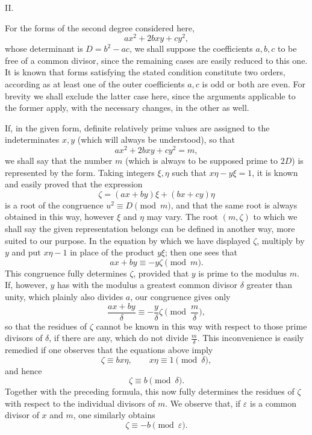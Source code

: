 \documentclass[11pt]{article}
\begin{document}
\begin{center}II.\end{center}

For the forms of the second degree considered here,
\[
 ax^2+2bxy+cy^2,
\]
whose determinant is $D=b^2-ac$, we shall suppose the coefficients $a,b,c$ to be free of a common divisor, since the remaining cases are easily reduced to this one. It is known that forms satisfying the stated condition constitute two orders, according as at least one of the outer coefficients $a,c$ is odd or both are even. For brevity we shall exclude the latter case here, since the arguments applicable to the former apply, with the necessary changes, in the other as well.

If, in the given form, definite relatively prime values are assigned to the indeterminates $x,y$ (which will always be understood), so that
\[
 ax^2+2bxy+cy^2=m,
\]
we shall say that the number $m$ (which is always to be supposed prime to $2D$) is represented by the form. Taking integers $\xi,\eta$ such that $x\eta-y\xi=1$, it is known and easily proved that the expression
\[
 \zeta=(ax+by)\xi+(bx+cy)\eta
\]
is a root of the congruence $u^2\equiv D\pmod m$, and that the same root is always obtained in this way, however $\xi$ and $\eta$ may vary. The root $(m,\zeta)$ to which we shall say the given representation belongs can be defined in another way, more suited to our purpose. In the equation by which we have displayed $\zeta$, multiply by $y$ and put $x\eta-1$ in place of the product $y\xi$; then one sees that
\begin{equation}\tag{1}
 ax+by\equiv -y\zeta \pmod m.
\end{equation}
This congruence fully determines $\zeta$, provided that $y$ is prime to the modulus $m$. If, however, $y$ has with the modulus a greatest common divisor $\delta$ greater than unity, which plainly also divides $a$, our congruence gives only
\[
 \frac{ax+by}{\delta}\equiv -\frac{y}{\delta}\zeta\pmod {\frac m\delta},
\]
so that the residues of $\zeta$ cannot be known in this way with respect to those prime divisors of $\delta$, if there are any, which do not divide $\frac m\delta$. This inconvenience is easily remedied if one observes that the equations above imply
\[
 \zeta\equiv bx\eta,
 \qquad x\eta\equiv1\pmod\delta,
\]
and hence
\begin{equation}\tag{2}
 \zeta\equiv b\pmod\delta.
\end{equation}
Together with the preceding formula, this now fully determines the residues of $\zeta$ with respect to the individual divisors of $m$. We observe that, if $\varepsilon$ is a common divisor of $x$ and $m$, one similarly obtains
\begin{equation}\tag{3}
 \zeta\equiv -b\pmod\varepsilon.
\end{equation}
\end{document}
